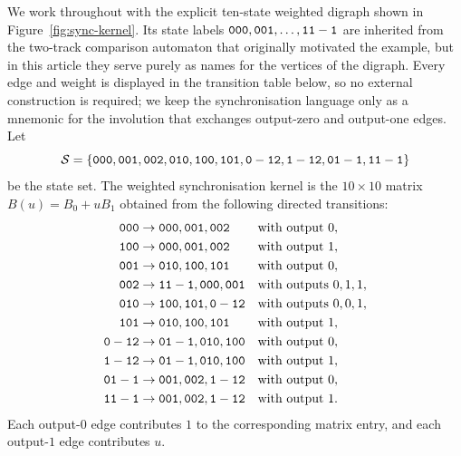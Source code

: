 \begin{definition}\label{def:sync-kernel}

We work throughout with the explicit ten-state weighted digraph shown in Figure~\ref{fig:sync-kernel}. Its state labels \(\mathtt{000},\mathtt{001},\dots,\mathtt{11-1}\) are inherited from the two-track comparison automaton that originally motivated the example, but in this article they serve purely as names for the vertices of the digraph. Every edge and weight is displayed in the transition table below, so no external construction is required; we keep the synchronisation language only as a mnemonic for the involution that exchanges output-zero and output-one edges.
Let
\[
  \mathcal S=
  \{\mathtt{000},\mathtt{001},\mathtt{002},\mathtt{010},\mathtt{100},\mathtt{101},
    \mathtt{0-12},\mathtt{1-12},\mathtt{01-1},\mathtt{11-1}\}
\]
be the state set. The weighted synchronisation kernel is the
\(10\times 10\) matrix \(B(u)=B_0+uB_1\) obtained from the following
directed transitions:
\begin{align*}
  \mathtt{000}&\to \mathtt{000},\mathtt{001},\mathtt{002}
    &&\text{with output }0,\\
  \mathtt{100}&\to \mathtt{000},\mathtt{001},\mathtt{002}
    &&\text{with output }1,\\
  \mathtt{001}&\to \mathtt{010},\mathtt{100},\mathtt{101}
    &&\text{with output }0,\\
  \mathtt{002}&\to \mathtt{11-1},\mathtt{000},\mathtt{001}
    &&\text{with outputs }0,1,1,\\
  \mathtt{010}&\to \mathtt{100},\mathtt{101},\mathtt{0-12}
    &&\text{with outputs }0,0,1,\\
  \mathtt{101}&\to \mathtt{010},\mathtt{100},\mathtt{101}
    &&\text{with output }1,\\
  \mathtt{0-12}&\to \mathtt{01-1},\mathtt{010},\mathtt{100}
    &&\text{with output }0,\\
  \mathtt{1-12}&\to \mathtt{01-1},\mathtt{010},\mathtt{100}
    &&\text{with output }1,\\
  \mathtt{01-1}&\to \mathtt{001},\mathtt{002},\mathtt{1-12}
    &&\text{with output }0,\\
  \mathtt{11-1}&\to \mathtt{001},\mathtt{002},\mathtt{1-12}
    &&\text{with output }1.
\end{align*}
Each output-\(0\) edge contributes \(1\) to the corresponding matrix
entry, and each output-\(1\) edge contributes \(u\).


\end{definition}
